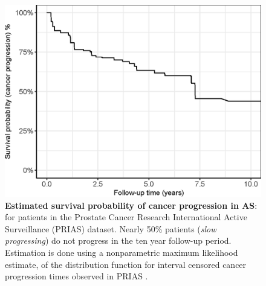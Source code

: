 \begin{figure}[!htb]
\captionsetup{justification=justified}
\centerline{\includegraphics[width=\columnwidth]{images/npmle_plot.eps}}
\caption{\textbf{Estimated survival probability of cancer progression in AS}: for patients in the Prostate Cancer Research International Active Surveillance (PRIAS) dataset. Nearly 50\% patients (\textit{slow progressing}) do not progress in the ten year follow-up period. Estimation is done using a nonparametric maximum likelihood estimate, of the distribution function for interval censored cancer progression times observed in PRIAS \citep{turnbull1976empirical}.}
\label{fig:npmle_plot}
\end{figure}

